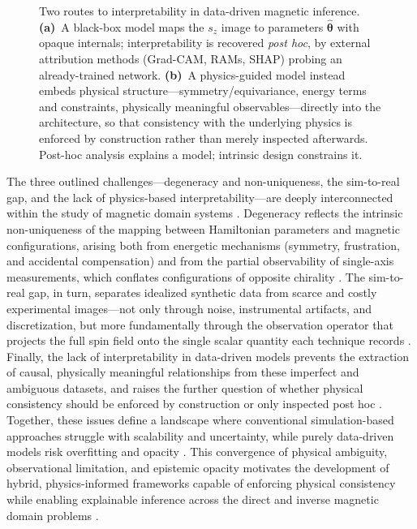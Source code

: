 \documentclass[letterpaper, 12, one column]{article}
\begin{document}
\begin{figure}[H]
{\begin{tikzpicture}
\end{tikzpicture}}
\caption{Two routes to interpretability in data-driven magnetic inference. \textbf{(a)}~A black-box model maps the $s_z$ image to parameters $\hat{\boldsymbol{\theta}}$ with opaque internals; interpretability is recovered \emph{post hoc}, by external attribution methods (Grad-CAM, RAMs, SHAP) probing an already-trained network. \textbf{(b)}~A physics-guided model instead embeds physical structure—symmetry/equivariance, energy terms and constraints, physically meaningful observables—directly into the architecture, so that consistency with the underlying physics is enforced by construction rather than merely inspected afterwards. Post-hoc analysis explains a model; intrinsic design constrains it.}
\label{fig:interpretability_challenge}
\end{figure}

The three outlined challenges---degeneracy and non-uniqueness, the sim-to-real gap, and the lack of physics-based interpretability---are deeply interconnected within the study of magnetic domain systems \cite{Feng2024}. Degeneracy reflects the intrinsic non-uniqueness of the mapping between Hamiltonian parameters and magnetic configurations, arising both from energetic mechanisms (symmetry, frustration, and accidental compensation) and from the partial observability of single-axis measurements, which conflates configurations of opposite chirality \cite{Meissner2021Potts}. The sim-to-real gap, in turn, separates idealized synthetic data from scarce and costly experimental images---not only through noise, instrumental artifacts, and discretization, but more fundamentally through the observation operator that projects the full spin field onto the single scalar quantity each technique records \cite{Misiurev2024Modeling}. Finally, the lack of interpretability in data-driven models prevents the extraction of causal, physically meaningful relationships from these imperfect and ambiguous datasets, and raises the further question of whether physical consistency should be enforced by construction or only inspected post hoc \cite{Park2024}. Together, these issues define a landscape where conventional simulation-based approaches struggle with scalability and uncertainty, while purely data-driven models risk overfitting and opacity \cite{Luo2020Current}. This convergence of physical ambiguity, observational limitation, and epistemic opacity motivates the development of hybrid, physics-informed frameworks capable of enforcing physical consistency while enabling explainable inference across the direct and inverse magnetic domain problems \cite{Wu2024PhysicsInformed}.
\end{document}
